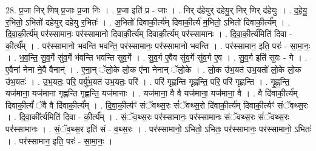 \documentclass[17pt]{extarticle}
\begin{document}
28. प्र॒जा निर् णिष् प्र॒जाः प्र॒जा निः । . प्र॒जा इति॑ प्र - जाः । . निर् द॑हेयुर् दहेयु॒र् निर् णिर् द॑हेयुः । . द॒हे॒यु॒ र॒भितो॒ ऽभितो॑ दहेयुर् दहेयु र॒भितः॑ । . अ॒भितो॑ दिवाकी॒र्त्य॑म् दिवाकी॒र्त्य॑ म॒भितो॒ ऽभितो॑ दिवाकी॒र्त्य᳚म् । . दि॒वा॒की॒र्त्य॑म् पर॑स्सामानः॒ पर॑स्सामानो दिवाकी॒र्त्य॑म् दिवाकी॒र्त्य॑म् पर॑स्सामानः । . दि॒वा॒की॒र्त्य॑मिति॑ दिवा - की॒र्त्य᳚म् । . पर॑स्सामानो भवन्ति भवन्ति॒ पर॑स्सामानः॒ पर॑स्सामानो भवन्ति । . पर॑स्सामान॒ इति॒ परः॑ - सा॒मा॒नः॒ । . भ॒व॒न्ति॒ सु॒व॒र्गे सु॑व॒र्गे भ॑वन्ति भवन्ति सुव॒र्गे । . सु॒व॒र्ग ए॒वैव सु॑व॒र्गे सु॑व॒र्ग ए॒व । . सु॒व॒र्ग इति॑ सुवः - गे । . ए॒वैना॑ नेना ने॒वै वैनान्॑ । . ए॒ना॒न् ॅलो॒के लो॒क ए॑ना नेनान् ॅलो॒के । . लो॒क उ॑भ॒यत॑ उभ॒यतो॑ लो॒के लो॒क उ॑भ॒यतः॑ । . उ॒भ॒यतः॒ परि॒ पर्यु॑भ॒यत॑ उभ॒यतः॒ परि॑ । . परि॑ गृह्णन्ति गृह्णन्ति॒ परि॒ परि॑ गृह्णन्ति । . गृ॒ह्ण॒न्ति॒ यज॑माना॒ यज॑माना गृह्णन्ति गृह्णन्ति॒ यज॑मानाः । . यज॑माना॒ वै वै यज॑माना॒ यज॑माना॒ वै । . वै दि॑वाकी॒र्त्य॑म् दिवाकी॒र्त्यं॑ ॅवै वै दि॑वाकी॒र्त्य᳚म् । . दि॒वा॒की॒र्त्यꣳ॑ संॅवथ्स॒रः सं॑ॅवथ्स॒रो दि॑वाकी॒र्त्य॑म् दिवाकी॒र्त्यꣳ॑ संॅवथ्स॒रः । . दि॒वा॒की᳚र्त्यमिति॑ दिवा - की॒र्त्य᳚म् । . सं॒ॅव॒थ्स॒रः पर॑स्सामानः॒ पर॑स्सामानः संॅवथ्स॒रः सं॑ॅवथ्स॒रः पर॑स्सामानः । . सं॒ॅव॒थ्स॒र इति॑ सं - व॒थ्स॒रः । . पर॑स्सामानो॒ ऽभितो॒ ऽभितः॒ पर॑स्सामानः॒ पर॑स्सामानो॒ ऽभितः॑ । . पर॑स्सामान॒ इति॒ परः॑ - सा॒मा॒नः॒ । \newline
\end{document}
